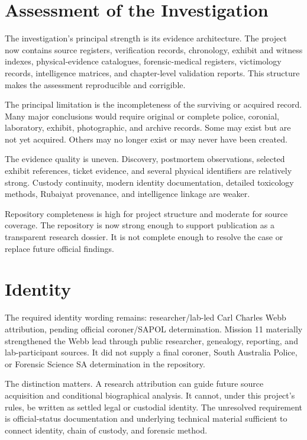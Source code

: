 \section{Assessment of the Investigation}

The investigation's principal strength is its evidence architecture. The project now contains source registers, verification records, chronology, exhibit and witness indexes, physical-evidence catalogues, forensic-medical registers, victimology records, intelligence matrices, and chapter-level validation reports. This structure makes the assessment reproducible and corrigible.

The principal limitation is the incompleteness of the surviving or acquired record. Many major conclusions would require original or complete police, coronial, laboratory, exhibit, photographic, and archive records. Some may exist but are not yet acquired. Others may no longer exist or may never have been created.

The evidence quality is uneven. Discovery, postmortem observations, selected exhibit references, ticket evidence, and several physical identifiers are relatively strong. Custody continuity, modern identity documentation, detailed toxicology methods, Rubaiyat provenance, and intelligence linkage are weaker.

Repository completeness is high for project structure and moderate for source coverage. The repository is now strong enough to support publication as a transparent research dossier. It is not complete enough to resolve the case or replace future official findings.

\section{Identity}

The required identity wording remains: researcher/lab-led Carl Charles Webb attribution, pending official coroner/SAPOL determination. Mission 11 materially strengthened the Webb lead through public researcher, genealogy, reporting, and lab-participant sources. It did not supply a final coroner, South Australia Police, or Forensic Science SA determination in the repository.

The distinction matters. A research attribution can guide future source acquisition and conditional biographical analysis. It cannot, under this project's rules, be written as settled legal or custodial identity. The unresolved requirement is official-status documentation and underlying technical material sufficient to connect identity, chain of custody, and forensic method.

